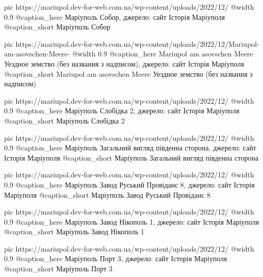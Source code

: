 	pic https://mariupol.dev-for-web.com.ua/wp-content/uploads/2022/12/%
	@width 0.9
	@caption_here Маріуполь Собор, джерело: сайт Історія Маріуполя
	@caption_short Маріуполь Собор

	pic https://mariupol.dev-for-web.com.ua/wp-content/uploads/2022/12/Mariupol-am-asovschen-Meere-%
	@width 0.9
	@caption_here Mariupol am asovschen Meere Уездное земство (без названия з надписом), джерело: сайт Історія Маріуполя
	@caption_short Mariupol am asovschen Meere Уездное земство (без названия з надписом)

	pic https://mariupol.dev-for-web.com.ua/wp-content/uploads/2022/12/%
	@width 0.9
	@caption_here Маріуполь Слобідка 2, джерело: сайт Історія Маріуполя
	@caption_short Маріуполь Слобідка 2

	pic https://mariupol.dev-for-web.com.ua/wp-content/uploads/2022/12/%
	@width 0.9
	@caption_here Маріуполь Загальний вигляд південна сторона, джерело: сайт Історія Маріуполя
	@caption_short Маріуполь Загальний вигляд південна сторона

	pic https://mariupol.dev-for-web.com.ua/wp-content/uploads/2022/12/%
	@width 0.9
	@caption_here Маріуполь Завод Руський Провіданс 8, джерело: сайт Історія Маріуполя
	@caption_short Маріуполь Завод Руський Провіданс 8

	pic https://mariupol.dev-for-web.com.ua/wp-content/uploads/2022/12/%
	@width 0.9
	@caption_here Маріуполь Завод Нікополь 1, джерело: сайт Історія Маріуполя
	@caption_short Маріуполь Завод Нікополь 1

	pic https://mariupol.dev-for-web.com.ua/wp-content/uploads/2022/12/%
	@width 0.9
	@caption_here Маріуполь Порт 3, джерело: сайт Історія Маріуполя
	@caption_short Маріуполь Порт 3


